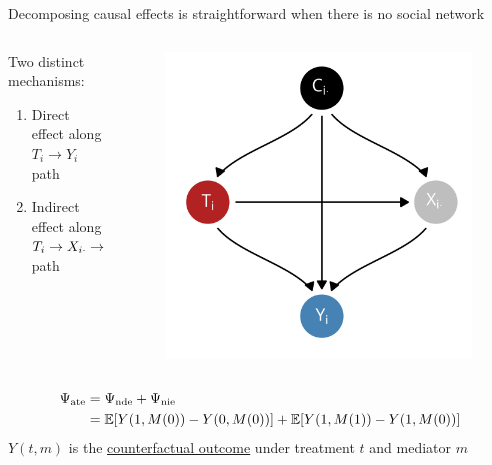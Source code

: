 \documentclass[aspectratio=169]{beamer}
\theoremstyle{remark}
\begin{document}
\begin{frame}{Decomposing causal effects is straightforward when there is no social network}
    \begin{columns}
        \begin{column}{0.65\textwidth}
            Two distinct mechanisms:
            \begin{enumerate}
                \item Direct effect along $T_i \to Y_i$ path
                \item Indirect effect along $T_i \to X_{i \cdot} \to Y_i$ path
            \end{enumerate}
        \end{column}
        \begin{column}{0.35\textwidth}
            \centering
            \begin{figure}[ht]
                \includegraphics[height=0.5\textheight]{figures/dags/mediating.png}
            \end{figure}
        \end{column}
    \end{columns}
    \begin{definition}
        \begin{equation*}
            \begin{aligned}
                \ate & = \nde + \nie                                               \\
                     & = \E{Y(1, M(0)) - Y(0, M(0))} + \E{Y(1, M(1)) - Y(1, M(0))}
            \end{aligned}
        \end{equation*}
        \centering
        $Y(t, m)$ is the \underline{counterfactual outcome} under treatment $t$ and mediator $m$
    \end{definition}
\end{frame}
\end{document}
